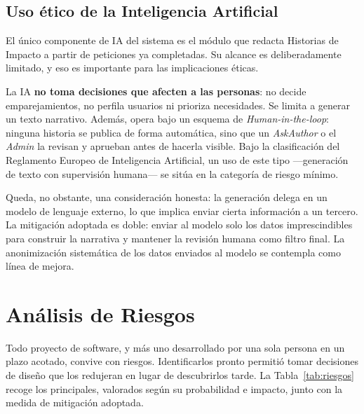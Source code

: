\documentclass[11pt,oneside,spanish,listoffigures,listoftables]{tfgetsinf}
\begin{document}
\subsection{Uso ético de la Inteligencia Artificial}

El único componente de IA del sistema es el módulo que redacta Historias de Impacto a partir de peticiones ya completadas. Su alcance es deliberadamente limitado, y eso es importante para las implicaciones éticas.

La IA \textbf{no toma decisiones que afecten a las personas}: no decide emparejamientos, no perfila usuarios ni prioriza necesidades. Se limita a generar un texto narrativo. Además, opera bajo un esquema de \textit{Human-in-the-loop}: ninguna historia se publica de forma automática, sino que un \textit{AskAuthor} o el \textit{Admin} la revisan y aprueban antes de hacerla visible. Bajo la clasificación del Reglamento Europeo de Inteligencia Artificial, un uso de este tipo —generación de texto con supervisión humana— se sitúa en la categoría de riesgo mínimo.

Queda, no obstante, una consideración honesta: la generación delega en un modelo de lenguaje externo, lo que implica enviar cierta información a un tercero. La mitigación adoptada es doble: enviar al modelo solo los datos imprescindibles para construir la narrativa y mantener la revisión humana como filtro final. La anonimización sistemática de los datos enviados al modelo se contempla como línea de mejora.

\section{Análisis de Riesgos}

Todo proyecto de software, y más uno desarrollado por una sola persona en un plazo acotado, convive con riesgos. Identificarlos pronto permitió tomar decisiones de diseño que los redujeran en lugar de descubrirlos tarde. La Tabla~\ref{tab:riesgos} recoge los principales, valorados según su probabilidad e impacto, junto con la medida de mitigación adoptada.
\end{document}
